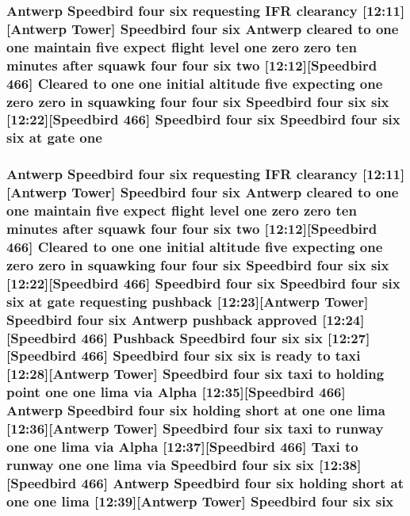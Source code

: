 \subsubsection[{\texorpdfstring{one}{one}}]{\setlength{\rightskip}{0pt plus 5cm}Antwerp Speedbird four {\bf six} requesting I\+FR clearancy \mbox{[}12\+:11\mbox{]}\mbox{[}Antwerp {\bf Tower}\mbox{]} Speedbird four {\bf six} Antwerp cleared to one one maintain five expect flight level one {\bf zero} {\bf zero} {\bf ten} minutes after squawk four four {\bf six} {\bf two} \mbox{[}12\+:12\mbox{]}\mbox{[}Speedbird 466\mbox{]} Cleared to one one initial altitude five expecting one {\bf zero} {\bf zero} in {\bf squawking} four four {\bf six} Speedbird four {\bf six} {\bf six} \mbox{[}12\+:22\mbox{]}\mbox{[}Speedbird 466\mbox{]} Speedbird four {\bf six} Speedbird four {\bf six} {\bf six} at gate one}\hypertarget{ATC_8txt_aae2d1d41f2ea606999281eb5037f8eff}{}\label{ATC_8txt_aae2d1d41f2ea606999281eb5037f8eff}
\subsubsection[{\texorpdfstring{six}{six}}]{\setlength{\rightskip}{0pt plus 5cm}Antwerp Speedbird four six requesting I\+FR clearancy \mbox{[}12\+:11\mbox{]}\mbox{[}Antwerp {\bf Tower}\mbox{]} Speedbird four six Antwerp cleared to {\bf one} {\bf one} maintain five expect flight level {\bf one} {\bf zero} {\bf zero} {\bf ten} minutes after squawk four four six {\bf two} \mbox{[}12\+:12\mbox{]}\mbox{[}Speedbird 466\mbox{]} Cleared to {\bf one} {\bf one} initial altitude five expecting {\bf one} {\bf zero} {\bf zero} in {\bf squawking} four four six Speedbird four six six \mbox{[}12\+:22\mbox{]}\mbox{[}Speedbird 466\mbox{]} Speedbird four six Speedbird four six six at gate requesting pushback \mbox{[}12\+:23\mbox{]}\mbox{[}Antwerp {\bf Tower}\mbox{]} Speedbird four six Antwerp pushback {\bf approved} \mbox{[}12\+:24\mbox{]}\mbox{[}Speedbird 466\mbox{]} Pushback Speedbird four six six \mbox{[}12\+:27\mbox{]}\mbox{[}Speedbird 466\mbox{]} Speedbird four six six is ready to taxi \mbox{[}12\+:28\mbox{]}\mbox{[}Antwerp {\bf Tower}\mbox{]} Speedbird four six taxi to holding point {\bf one} {\bf one} {\bf lima} via {\bf Alpha} \mbox{[}12\+:35\mbox{]}\mbox{[}Speedbird 466\mbox{]} Antwerp Speedbird four six holding short at {\bf one} {\bf one} {\bf lima} \mbox{[}12\+:36\mbox{]}\mbox{[}Antwerp {\bf Tower}\mbox{]} Speedbird four six taxi to runway {\bf one} {\bf one} {\bf lima} via {\bf Alpha} \mbox{[}12\+:37\mbox{]}\mbox{[}Speedbird 466\mbox{]} Taxi to runway {\bf one} {\bf one} {\bf lima} via Speedbird four six six \mbox{[}12\+:38\mbox{]}\mbox{[}Speedbird 466\mbox{]} Antwerp Speedbird four six holding short at {\bf one} {\bf one} {\bf lima} \mbox{[}12\+:39\mbox{]}\mbox{[}Antwerp {\bf Tower}\mbox{]} Speedbird four six six}\hypertarget{ATC_8txt_a42ba60ceca6351d258f16b06edec96ac}{}\label{ATC_8txt_a42ba60ceca6351d258f16b06edec96ac}
